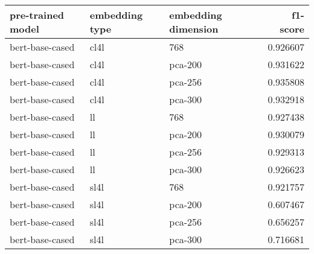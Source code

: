 \begin{tabular}{lllr}
\hline
 pre-trained model   & embedding type   & embedding dimension   &   f1-score \\
\hline
 bert-base-cased     & cl4l             & 768                   &   0.926607 \\
 bert-base-cased     & cl4l             & pca-200               &   0.931622 \\
 bert-base-cased     & cl4l             & pca-256               &   0.935808 \\
 bert-base-cased     & cl4l             & pca-300               &   0.932918 \\
 bert-base-cased     & ll               & 768                   &   0.927438 \\
 bert-base-cased     & ll               & pca-200               &   0.930079 \\
 bert-base-cased     & ll               & pca-256               &   0.929313 \\
 bert-base-cased     & ll               & pca-300               &   0.926623 \\
 bert-base-cased     & sl4l             & 768                   &   0.921757 \\
 bert-base-cased     & sl4l             & pca-200               &   0.607467 \\
 bert-base-cased     & sl4l             & pca-256               &   0.656257 \\
 bert-base-cased     & sl4l             & pca-300               &   0.716681 \\
\hline
\end{tabular}